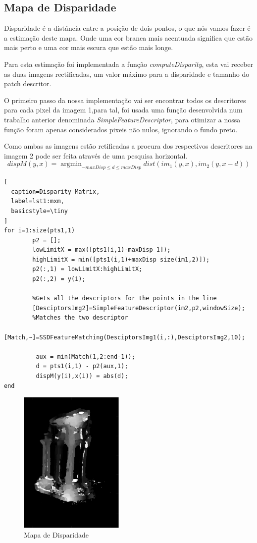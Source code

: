 \documentclass[journal]{IEEEtran}
\DeclareMathOperator*{\argmin}{\arg\min}
\begin{document}
\subsection*{Mapa de Disparidade}
\par Disparidade é a distância entre a posição de dois pontos, o que nós vamos fazer é a estimação deste mapa. Onde uma cor branca mais acentuada significa que estão mais perto e uma cor mais escura que estão mais longe.
\par Para esta estimação foi implementada a função \textit{computeDisparity}, esta vai receber as duas imagens rectificadas, um valor máximo para a disparidade e tamanho do patch descritor.
\par O primeiro passo da nossa implementação vai ser encontrar todos os descritores para cada pixel da imagem 1,para tal, foi usada uma função desenvolvida num trabalho anterior denominada \textit{SimpleFeatureDescriptor}, para otimizar a nossa função foram apenas considerados pixeis não nulos, ignorando o fundo preto.
\par Como ambas as imagens estão retificadas a procura dos respectivos descritores na imagem 2 pode ser feita através de uma pesquisa horizontal.
\begin{equation}
    dispM(y,x) = \argmin_{-maxDisp\leq d \leq maxDisp} dist(im_1(y,x),im_2(y,x-d))
\end{equation}

\begin{lstlisting}[
  caption=Disparity Matrix,
  label=lst1:mxm,
  basicstyle=\tiny
]
for i=1:size(pts1,1)
        p2 = [];
        lowLimitX = max([pts1(i,1)-maxDisp 1]);
        highLimitX = min([pts1(i,1)+maxDisp size(im1,2)]);
        p2(:,1) = lowLimitX:highLimitX;
        p2(:,2) = y(i);
        
        %Gets all the descriptors for the points in the line
        [DesciptorsImg2]=SimpleFeatureDescriptor(im2,p2,windowSize); 
        %Matches the two descriptor
        [Match,~]=SSDFeatureMatching(DesciptorsImg1(i,:),DesciptorsImg2,10); 
        
         aux = min(Match(1,2:end-1));
         d = pts1(i,1) - p2(aux,1);
         dispM(y(i),x(i)) = abs(d);
end
\end{lstlisting}

\begin{figure}[H]
    \centering
    \includegraphics[width=2in]{Images/dMap.png}
    \caption{Mapa de Disparidade}
\end{figure}
\end{document}
